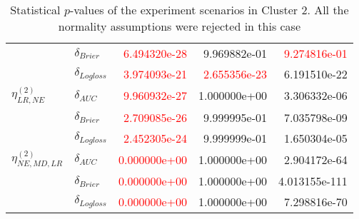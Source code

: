 \begin{table}[!h]
\begin{tabular}{l|lrrr}
                             & $\delta_{Brier}$ &  \textcolor{red}{6.494320e-28} &  9.969882e-01 &   \textcolor{red}{9.274816e-01} \\
                             & $\delta_{Logloss}$ &  \textcolor{red}{3.974093e-21} &  \textcolor{red}{2.655356e-23} &   6.191510e-22 \\
                             \hline
        $\eta^{(2)}_{LR, NE}$ & $\delta_{AUC}$ &  \textcolor{red}{9.960932e-27} &  1.000000e+00 &   3.306332e-06 \\
                             & $\delta_{Brier}$ &  \textcolor{red}{2.709085e-26} &  9.999995e-01 &   7.035798e-09 \\
                             & $\delta_{Logloss}$ &  \textcolor{red}{2.452305e-24} &  9.999999e-01 &   1.650304e-05 \\
                             \hline
        $\eta^{(2)}_{NE, MD, LR}$ & $\delta_{AUC}$ &  \textcolor{red}{0.000000e+00} &  1.000000e+00 &   2.904172e-64 \\
                             & $\delta_{Brier}$ &  \textcolor{red}{0.000000e+00} &  1.000000e+00 &  4.013155e-111 \\
                             & $\delta_{Logloss}$ &  \textcolor{red}{0.000000e+00} &  1.000000e+00 &   7.298816e-70 \\
        \bottomrule
\end{tabular}        
\caption{Statistical $p$-values of the experiment scenarios in Cluster 2. All the normality assumptions were rejected in this case}
\label{table:result-cluster2}
\end{table}
